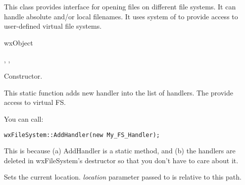 %
%

\section{}\label{wxfilesystem}

This class provides interface for opening files on different
file systems. It can handle absolute and/or local filenames.
It uses system of  to
provide access to user-defined virtual file systems.


wxObject


,
,


\label{wxfilesystemwxfilesystem}


Constructor. 

\label{wxfilesystemaddhandler}


This static function adds new handler into the list of handlers.
The  provide access to virtual FS.


You can call:

\begin{verbatim}
wxFileSystem::AddHandler(new My_FS_Handler);
\end{verbatim}

This is because (a) AddHandler is a static method, and (b) the handlers
are deleted in wxFileSystem's destructor so that you don't have to
care about it.

\label{wxfilesystemchangepathto}


Sets the current location. {\it location} parameter passed to 
 is relative to this path.

